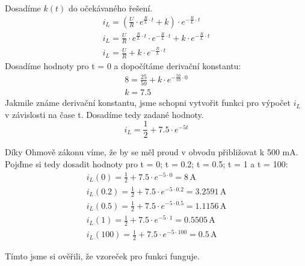 Dosadíme \( k(t) \) do očekávaného řešení.
\nopagebreak
\[
\renewcommand{\arraystretch}{1.5}
\begin{array}{l}
i_L = (\frac{U}{R} \cdot e^{\frac{R}{L} \cdot t} + k) \cdot e^{-\frac{R}{L} \cdot t} \\
i_L = \frac{U}{R} \cdot e^{\frac{R}{L} \cdot t} \cdot e^{-\frac{R}{L} \cdot t} + k \cdot e^{-\frac{R}{L} \cdot t} \\
i_L = \frac{U}{R} + k \cdot e^{-\frac{R}{L} \cdot t}
\end{array}
\]
Dosadíme hodnoty pro t = 0 a dopočítáme derivační konstantu:
\nopagebreak
\[
\begin{array}{l}
8 = \frac{25}{50} + k \cdot e^{-\frac{50}{10} \cdot 0} \\
k = 7.5
\end{array}
\]
Jakmile známe derivační konstantu, jsme schopni vytvořit funkci pro výpočet \( i_L \) v závislosti na čase t.
Dosadíme tedy zadané hodnoty.
\nopagebreak
\[
i_L = \frac{1}{2} + 7.5 \cdot e^{-5t}
\]

Díky Ohmově zákonu víme, že by se měl proud v obvodu přibližovat k 500 mA.
Pojďme si tedy dosadit hodnoty pro t = 0; t = 0.2; t = 0.5; t = 1 a t = 100:
\nopagebreak
\[
\renewcommand{\arraystretch}{1.5}
\begin{array}{l}
i_L(0) = \frac{1}{2} + 7.5 \cdot e^{-5 \cdot 0} = 8 \, \mathrm{A} \\
i_L(0.2) = \frac{1}{2} + 7.5 \cdot e^{-5 \cdot 0.2} = 3.2591 \, \mathrm{A} \\
i_L(0.5) = \frac{1}{2} + 7.5 \cdot e^{-5 \cdot 0.5} = 1.1156 \, \mathrm{A} \\
i_L(1) = \frac{1}{2} + 7.5 \cdot e^{-5 \cdot 1} = 0.5505 \, \mathrm{A} \\
i_L(100) = \frac{1}{2} + 7.5 \cdot e^{-5 \cdot 100} = 0.5 \, \mathrm{A}
\end{array}
\]

Tímto jsme si ověřili, že vzoreček pro funkci funguje.